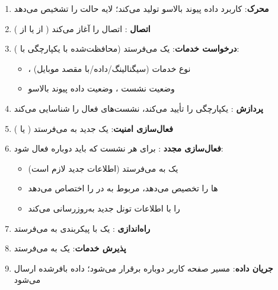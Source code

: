 \begin{enumerate}
\def\labelenumi{\arabic{enumi}.}
\tightlist
\item
  \textbf{محرک}: کاربرد  داده پیوند بالاسو تولید می‌کند؛ لایه  حالت  را تشخیص می‌دهد
\item
  \textbf{اتصال }:  اتصال  را آغاز می‌کند ( از  یا  از )
\item
  \textbf{درخواست خدمات}:  یک  می‌فرستد (محافظت‌شده با یکپارچگی با ):

  \begin{itemize}
  \tightlist
  \item
    ، نوع خدمات (سیگنالینگ/\allowbreak{}داده/\allowbreak{}با مقصد موبایل)
  \item
    وضعیت نشست ، وضعیت داده پیوند بالاسو
  \end{itemize}
\item
  \textbf{پردازش }:  یکپارچگی را تأیید می‌کند، نشست‌های  فعال را شناسایی می‌کند
\item
  \textbf{فعال‌سازی امنیت}:  یک  جدید به  می‌فرستد ( یا )
\item
  \textbf{فعال‌سازی مجدد }: برای هر نشست  که باید دوباره فعال شود:

  \begin{itemize}
  \tightlist
  \item
     یک  به  می‌فرستد (اطلاعات  جدید لازم است)
  \item
    ها را تخصیص می‌دهد،  مربوط به  در  را اختصاص می‌دهد
  \item
     را با اطلاعات تونل  جدید به‌روزرسانی می‌کند 
  \end{itemize}
\item
  \textbf{راه‌اندازی }:  یک  با پیکربندی  به  می‌فرستد
\item
  \textbf{پذیرش خدمات}:  یک  به  می‌فرستد
\item
  \textbf{جریان داده}: مسیر صفحه کاربر دوباره برقرار می‌شود؛ داده  بافر‌شده ارسال می‌شود
\end{enumerate}


